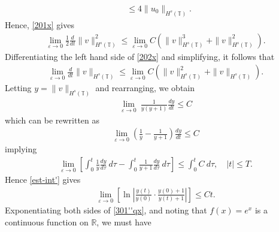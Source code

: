 \documentclass[12pt,reqno]{amsart}
\newcommand{\rr}{\mathbb{R}}
\newcommand{\ci}{\mathbb{T}}
\newcommand{\ee}{\varepsilon}
\theoremstyle{plain}  %
\theoremstyle{definition}
\begin{document}
\begin{appendices}
\begin{equation*}
\begin{split}
		& \le 4 \|u_0\|_{H^s(\ci)}.
	\end{split}
\end{equation*}
Hence, \eqref{201x} gives
\begin{equation}
	\begin{split}
		\lim_{\ee \to 0} \frac{1}{2} \frac{d}{dt} \|v\|_{H^s(\ci)}^2 \le
		 \lim_{\ee \to 0} C (
		\|v\|_{H^s(\ci)}^3 + \|v\|_{H^s(\ci)}^2).
		\label{202x}
	\end{split}
\end{equation}
Differentiating the left hand side of
\eqref{202x} and simplifying, it follows that
\begin{equation*}
	\begin{split}
		\lim_{\ee \to 0}\frac{d}{dt} \|v\|_{H^s(\ci)} \le
		\lim_{\ee \to 0} C (\|v\|_{H^s(\ci)}^2 +
		\|v\|_{H^s(\ci)}).
	\end{split}
\end{equation*}
Letting $y = \|v\|_{H^s(\ci)}$ and rearranging, we obtain
\begin{equation*}
	\begin{split}
		\lim_{\ee \to 0} \ \frac{1}{y(y+1)} \frac{dy}{dt} \le C	
	\end{split}
\end{equation*}
which can be rewritten as
\begin{equation*}
	\begin{split}
		\lim_{\ee \to 0}
		\left( \frac{1}{y} - \frac{1}{y+1} \right)\frac{dy}{dt} \le C
	\end{split}
\end{equation*}
implying
\begin{equation}
	\label{est-int'}
	\begin{split}
		\lim_{\ee \to 0} \left [
\int_0^t \frac{1}{y} \frac{dy}{d \tau} \ d \tau
		- \int_0^t \frac{1}{y+1} \frac{dy}{d \tau} \ d \tau \right ]
		\le \int_0^t C \ d \tau, \quad |t| \le T.
	\end{split}
\end{equation}
Hence \eqref{est-int'} gives 
\begin{equation}
	\begin{split}
	\lim_{\ee \to 0} 
	\left [ \ln \left | \frac{y(t)}{y(0)}
	\cdot \frac{y(0) + 1}{y(t) + 1} \right | \right ] \le C t.
		\label{301''qx}
	\end{split}
\end{equation}
Exponentiating both sides of \eqref{301''qx}, and noting that $f(x) = e^x$
is a continuous function on $\rr$, we must have
\begin{equation*}

\end{equation*}
\end{appendices}
\end{document}
